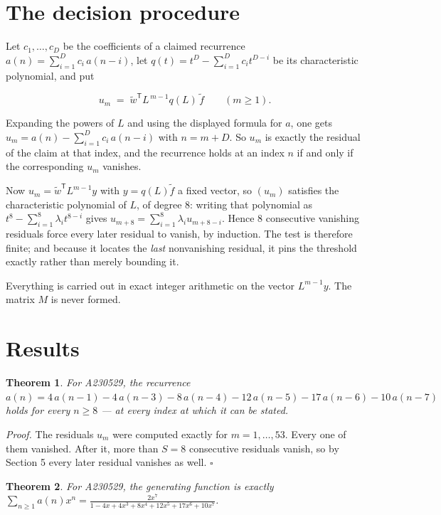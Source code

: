 \documentclass[11pt]{article}
\newtheorem{theorem}{Theorem}
\theoremstyle{definition}
\begin{document}
\section{The decision procedure}

Let $c_1,\dots,c_D$ be the coefficients of a claimed recurrence $a(n) = \sum_{i=1}^{D} c_i\,a(n-i)$, let $q(t) = t^{D} - \sum_{i=1}^{D} c_i t^{D-i}$ be its characteristic polynomial, and put

\[u_m \;=\; \tilde w^{\mathsf T} L^{\,m-1} q(L)\,\tilde f \qquad (m \ge 1).\]

Expanding the powers of $L$ and using the displayed formula for $a$, one gets $u_m = a(n) - \sum_{i=1}^{D} c_i\,a(n-i)$ with $n = m + D$. So $u_m$ is exactly the residual of the claim at that index, and the recurrence holds at an index $n$ if and only if the corresponding $u_m$ vanishes.

Now $u_m = \tilde w^{\mathsf T} L^{m-1} y$ with $y = q(L)\tilde f$ a fixed vector, so $(u_m)$ satisfies the characteristic polynomial of $L$, of degree $8$: writing that polynomial as $t^{8} - \sum_{i=1}^{8} \lambda_i t^{8-i}$ gives $u_{m+8} = \sum_{i=1}^{8} \lambda_i u_{m+8-i}$. Hence $8$ consecutive vanishing residuals force every later residual to vanish, by induction. The test is therefore finite; and because it locates the {\itshape last} nonvanishing residual, it pins the threshold exactly rather than merely bounding it.

Everything is carried out in exact integer arithmetic on the vector $L^{m-1}y$. The matrix $M$ is never formed.

\section{Results}

\begin{theorem} For A230529, the recurrence $a(n) = 4\,a(n-1) - 4\,a(n-3) - 8\,a(n-4) - 12\,a(n-5) - 17\,a(n-6) - 10\,a(n-7)$ holds for every $n \ge 8$ --- at every index at which it can be stated.\end{theorem}

{\itshape Proof.} The residuals $u_m$ were computed exactly for $m = 1,\dots,53$. Every one of them vanished. After it, more than $S = 8$ consecutive residuals vanish, so by Section 5 every later residual vanishes as well. $\square$

\begin{theorem} For A230529, the generating function is exactly $\sum_{n\ge 1} a(n)x^n = \frac{2x^{7}}{1 - 4x + 4x^{3} + 8x^{4} + 12x^{5} + 17x^{6} + 10x^{7}}$.\end{theorem}
\end{document}
